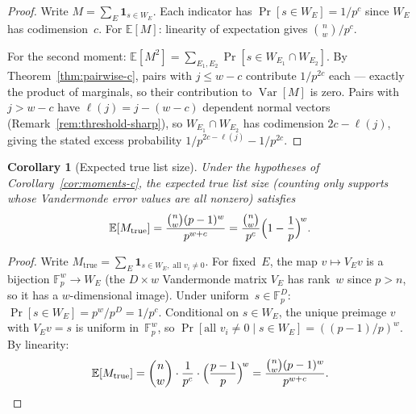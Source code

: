 \documentclass[11pt]{article}
\newtheorem{corollary}[theorem]{Corollary}
\newcommand{\FF}{\mathbb{F}}
\newcommand{\EE}{\mathbb{E}}
\DeclareMathOperator{\Var}{Var}
\begin{document}
\begin{proof}
Write $M = \sum_E \mathbf{1}_{s \in W_E}$. Each indicator has $\Pr[s \in W_E] = 1/p^c$ since $W_E$ has codimension~$c$. For $\EE[M]$: linearity of expectation gives $\binom{n}{w}/p^c$.

For the second moment: $\EE[M^2] = \sum_{E_1, E_2} \Pr[s \in W_{E_1} \cap W_{E_2}]$. By Theorem~\ref{thm:pairwise-c}, pairs with $j \leq w - c$ contribute $1/p^{2c}$ each --- exactly the product of marginals, so their contribution to $\Var[M]$ is zero. Pairs with $j > w - c$ have $\ell(j) = j - (w-c)$ dependent normal vectors (Remark~\ref{rem:threshold-sharp}), so $W_{E_1} \cap W_{E_2}$ has codimension $2c - \ell(j)$, giving the stated excess probability $1/p^{2c - \ell(j)} - 1/p^{2c}$.
\end{proof}

\begin{corollary}[Expected true list size]
\label{cor:expected-Mtrue}
Under the hypotheses of Corollary~\ref{cor:moments-c}, the expected \emph{true} list size (counting only supports whose Vandermonde error values are all nonzero) satisfies
$$\EE[M_{\mathrm{true}}] = \frac{\binom{n}{w}(p-1)^w}{p^{w+c}} = \frac{\binom{n}{w}}{p^c}\Bigl(1 - \frac{1}{p}\Bigr)^{\!w}.$$
\end{corollary}

\begin{proof}
Write $M_{\mathrm{true}} = \sum_E \mathbf{1}_{s \in W_E,\;\text{all } v_i \neq 0}$. For fixed~$E$, the map $v \mapsto V_E v$ is a bijection $\FF_p^w \to W_E$ (the $D \times w$ Vandermonde matrix $V_E$ has rank~$w$ since $p > n$, so it has a $w$-dimensional image). Under uniform~$s \in \FF_p^D$: $\Pr[s \in W_E] = p^w / p^D = 1/p^c$. Conditional on $s \in W_E$, the unique preimage $v$ with $V_E v = s$ is uniform in~$\FF_p^w$, so $\Pr[\text{all } v_i \neq 0 \mid s \in W_E] = ((p{-}1)/p)^w$. By linearity:
$$\EE[M_{\mathrm{true}}] = \binom{n}{w} \cdot \frac{1}{p^c} \cdot \Bigl(\frac{p-1}{p}\Bigr)^{\!w} = \frac{\binom{n}{w}(p-1)^w}{p^{w+c}}. \qedhere$$
\end{proof}
\end{document}
